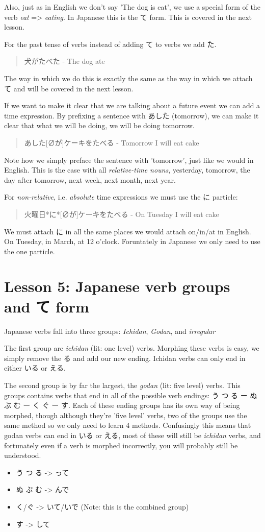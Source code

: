 \documentclass[11pt]{article}
\begin{document}
Also, just as in English we don't say 'The dog is eat', we use a special form of the verb \emph{eat} => \emph{eating}. In Japanese this is the て form. This is covered in the next lesson.

For the past tense of verbs instead of adding て to verbs we add た.
\begin{quote}
犬がたべた - The dog ate
\end{quote}
The way in which we do this is exactly the same as the way in which we attach て and will be covered in the next lesson.

If we want to make it clear that we are talking about a future event we can add a time expression. By prefixing a sentence with あした (tomorrow), we can make it clear that what we will be doing, we will be doing tomorrow.
\begin{quote}
あした[∅が]ケーキをたべる - Tomorrow I will eat cake
\end{quote}
Note how we simply preface the sentence with 'tomorrow', just like we would in English. This is the case with all \emph{relative-time nouns}, yesterday, tomorrow, the day after tomorrow, next week, next month, next year.

For \emph{non-relative}, i.e. \emph{absolute} time expressions we must use the に particle:
\begin{quote}
火曜日*に*[∅が]ケーキをたべる - On Tuesday I will eat cake
\end{quote}
We must attach に in all the same places we would attach on/in/at in English. On Tuesday, in March, at 12 o'clock. Foruntately in Japanese we only need to use the one particle.


\section{Lesson 5: Japanese verb groups and て form}
\label{sec:org5129e7a}
Japanese verbs fall into three groups: \emph{Ichidan}, \emph{Godan}, and \emph{irregular}

The first group are \emph{ichidan} (lit: one level) verbs. Morphing these verbs is easy, we simply remove the る and add our new ending. Ichidan verbs can only end in either いる or える.

The second group is by far the largest, the \emph{godan} (lit: five level) verbs. This groups contains verbs that end in all of the possible verb endings: う つ る ー ぬ ぶ む ー く ぐ ー す. Each of these ending groups has its own way of being morphed, though although they're 'five level' verbs, two of the groups use the same method so we only need to learn 4 methods. Confusingly this means that godan verbs can end in いる or える, most of these will still be \emph{ichidan} verbs, and fortunately even if a verb is morphed incorrectly, you will probably still be understood.
\begin{itemize}
\item う つ る -> って
\item ぬ ぶ む -> んで
\item く/ぐ -> いて/いで (Note: this is the combined group)
\item す -> して
\end{itemize}
\end{document}
